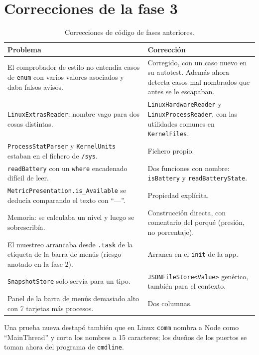 \documentclass[11pt,a4paper]{article}
\begin{document}
\section{Correcciones de la fase 3}\label{sec:correcciones3}
\begin{table}[H]
\centering
\begin{tabularx}{\textwidth}{@{}XX@{}}
\toprule
\textbf{Problema} & \textbf{Corrección}\\
\midrule
El comprobador de estilo no entendía casos de \texttt{enum} con
varios valores asociados y daba falsos avisos. & Corregido, con un
caso nuevo en su autotest. Además ahora detecta casos mal nombrados
que antes se le escapaban.\\
\texttt{LinuxExtrasReader}: nombre vago para dos cosas distintas. &
\texttt{LinuxHardwareReader} y \texttt{LinuxProcessReader}, con las
utilidades comunes en \texttt{KernelFiles}.\\
\texttt{ProcessStatParser} y \texttt{KernelUnits} estaban en el
fichero de \texttt{/sys}. & Fichero propio.\\
\texttt{readBattery} con un \texttt{where} encadenado difícil de
leer. & Dos funciones con nombre: \texttt{isBattery} y
\texttt{readBatteryState}.\\
\texttt{MetricPresentation.is\_Available} se deducía comparando el
texto con ``—''. & Propiedad explícita.\\
Memoria: se calculaba un nivel y luego se sobrescribía. &
Construcción directa, con comentario del porqué (presión, no
porcentaje).\\
El muestreo arrancaba desde \texttt{.task} de la etiqueta de la
barra de menús (riesgo anotado en la fase 2). & Arranca en el
\texttt{init} de la app.\\
\texttt{SnapshotStore} solo servía para un tipo. &
\texttt{JSONFileStore<Value>} genérico, también para el contexto.\\
Panel de la barra de menús demasiado alto con 7 tarjetas más
procesos. & Dos columnas.\\
\bottomrule
\end{tabularx}
\caption{Correcciones de código de fases anteriores.}
\end{table}
Una prueba nueva destapó también que en Linux \texttt{comm} nombra a
Node como ``MainThread'' y corta los nombres a 15 caracteres; los
dueños de los puertos se toman ahora del programa de
\texttt{cmdline}.
\end{document}
